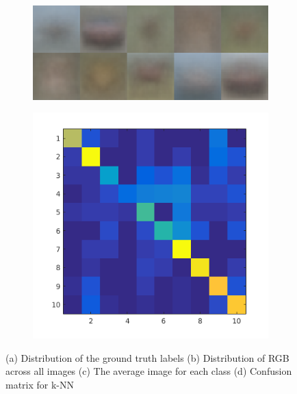 \documentclass{article} %
\begin{document}
\begin{figure}
\begin{subfigure}{.24\linewidth}
        \caption{}
        \end{subfigure}
        \begin{subfigure}{.24\linewidth}
            \centering
            \includegraphics[width=\linewidth]{images/avg-img.png}
        \caption{}
        \end{subfigure}
        \begin{subfigure}{.24\linewidth}
            \centering
            \includegraphics[width=.75\linewidth]{images/knn-confusion.png}
            \caption{}
        \end{subfigure}
        \caption{(a) Distribution of the ground truth labels (b) Distribution of RGB across all images (c) The average image for each class (d) Confusion matrix for k-NN}
    \end{figure}
    
    
    
\end{document}
